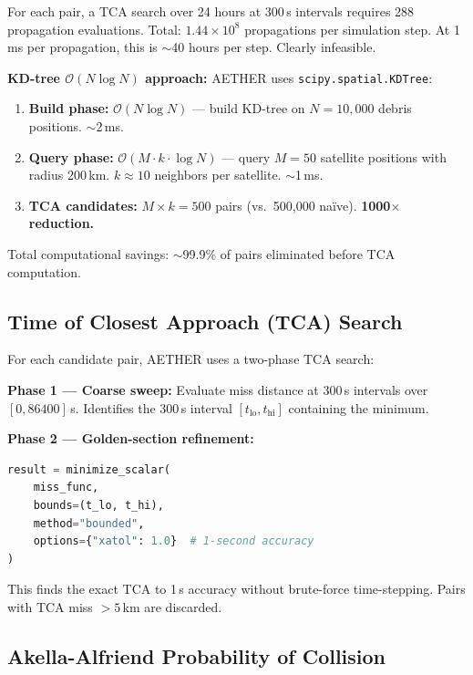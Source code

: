 \documentclass[12pt,a4paper]{article}
\begin{document}
For each pair, a TCA search over 24 hours at 300\,s intervals requires 288 propagation evaluations. Total: $1.44 \times 10^8$ propagations per simulation step. At 1\,ms per propagation, this is $\sim$40 hours per step. Clearly infeasible.

\textbf{KD-tree $\mathcal{O}(N \log N)$ approach:} AETHER uses \texttt{scipy.spatial.KDTree}:

\begin{enumerate}[noitemsep]
  \item \textbf{Build phase:} $\mathcal{O}(N \log N)$ --- build KD-tree on $N = 10{,}000$ debris positions. $\sim$2\,ms.
  \item \textbf{Query phase:} $\mathcal{O}(M \cdot k \cdot \log N)$ --- query $M = 50$ satellite positions with radius 200\,km. $k \approx 10$ neighbors per satellite. $\sim$1\,ms.
  \item \textbf{TCA candidates:} $M \times k = 500$ pairs (vs.\ 500,000 na\"{i}ve). \textbf{1000$\times$ reduction.}
\end{enumerate}

Total computational savings: $\sim$99.9\% of pairs eliminated before TCA computation.

\subsection{Time of Closest Approach (TCA) Search}

For each candidate pair, AETHER uses a two-phase TCA search:

\textbf{Phase 1 --- Coarse sweep:} Evaluate miss distance at 300\,s intervals over $[0, 86400]$\,s. Identifies the 300\,s interval $[t_{\text{lo}}, t_{\text{hi}}]$ containing the minimum.

\textbf{Phase 2 --- Golden-section refinement:}
\begin{lstlisting}[language=Python, caption={TCA fine search}]
result = minimize_scalar(
    miss_func,
    bounds=(t_lo, t_hi),
    method="bounded",
    options={"xatol": 1.0}  # 1-second accuracy
)
\end{lstlisting}

This finds the exact TCA to 1\,s accuracy without brute-force time-stepping. Pairs with TCA miss $> 5$\,km are discarded.

\subsection{Akella-Alfriend Probability of Collision}
\end{document}
